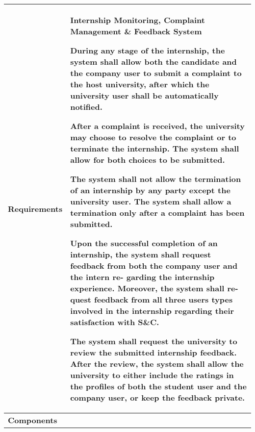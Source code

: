 \begin{table}[h]
    \centering
    \renewcommand{\arraystretch}{1.5} %
    \begin{tabular}{|C{0.3\textwidth}|L{0.65\textwidth}|} %
        \hline
        \textbf{Requirements} & 
        \textbf{Internship Monitoring, Complaint Management \& Feedback System} \par
        [FR35] During any stage of the internship, the system shall allow both the
        candidate and the company user to submit a complaint to the host
        university, after which the university user shall be automatically
        notified. \par
        [FR36] After a complaint is received, the university may choose to resolve
        the complaint or to terminate the internship. The system shall
        allow for both choices to be submitted. \par
        [FR37] The system shall not allow the termination of an internship by
        any party except the university user. The system shall allow a
        termination only after a complaint has been submitted. \par
        [FR38] Upon the successful completion of an internship, the system shall
        request feedback from both the company user and the intern re-
        garding the internship experience. Moreover, the system shall re-
        quest feedback from all three users types involved in the internship
        regarding their satisfaction with S\&C. \par
        [FR39] The system shall request the university to review the submitted
        internship feedback. After the review, the system shall allow the
        university to either include the ratings in the profiles of both the
        student user and the company user, or keep the feedback private. \\
        \hline
        \textbf{Components} & 
        \\
        \hline
    \end{tabular}
\end{table}

\clearpage